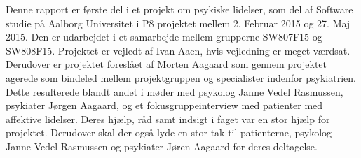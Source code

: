 Denne rapport er første del i et projekt om psykiske lidelser, som del af Software studie på Aalborg Universitet i P8 projektet mellem 2. Februar 2015 og 27. Maj 2015. 
Den er udarbejdet i et samarbejde mellem grupperne SW807F15 og SW808F15.
Projektet er vejledt af Ivan Aaen, hvis vejledning er meget værdsat.
Derudover er projektet foreslået af Morten Aagaard som gennem projektet agerede som bindeled mellem projektgruppen og specialister indenfor psykiatrien. Dette resulterede blandt andet i møder med psykolog Janne Vedel Rasmussen, psykiater Jørgen Aagaard, og et fokusgruppeinterview med patienter med affektive lidelser. Deres hjælp, råd samt indsigt i faget var en stor hjælp for projektet.
Derudover skal der også lyde en stor tak til patienterne, psykolog Janne Vedel Rasmussen og psykiater Jøren Aagaard for deres deltagelse.